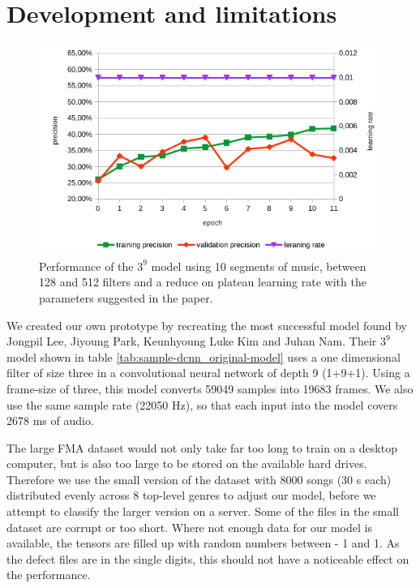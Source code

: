 \section{Development and limitations}
\label{sec:development}

\begin{figure}[!htb]
	\centering
	\includegraphics[width=.9\linewidth]{images/sample-dcnn-m3-n9-seg10-128_512-plateau.png}
	\caption{Performance of the $3^9$ model using 10 segments of music, between 128 and 512 filters and a reduce on plateau learning rate with the parameters suggested in the paper.}
	\label{fig:sample-dcnn-m3-n9-seg10-128_512-plateau}
\end{figure}


We created our own prototype by recreating the most successful model found by Jongpil Lee, Jiyoung Park, Keunhyoung Luke Kim and Juhan Nam. Their $3^9$ model shown in table \ref{tab:sample-dcnn_original-model} uses a one dimensional filter of size three in a convolutional neural network of depth 9 (1+9+1).  Using a frame-size of three, this model converts 59049 samples into 19683 frames. We also use the same sample rate (22050 Hz), so that each input into the model covers 2678 ms of audio.

The large FMA dataset \cite{fma_dataset} would not only take far too long to train on a desktop computer, but is also too large to be stored on the available hard drives. Therefore we use the small version of the dataset with 8000 songs (30 s each) distributed evenly across 8 top-level genres to adjust our model, before we attempt to classify the larger version on a server. Some of the files in the small dataset are corrupt or too short. Where not enough data for our model is available, the tensors are filled up with random numbers between - 1 and 1. As the defect files are in the single digits, this should not have a noticeable effect on the performance.


